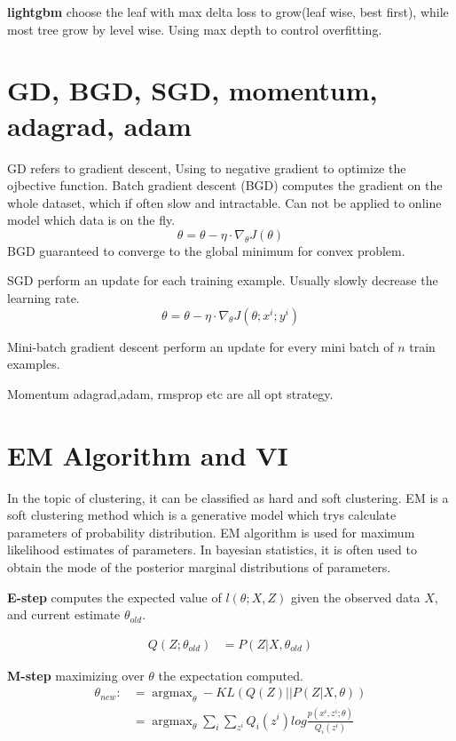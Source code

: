 \documentclass{article}
\begin{document}
\begin{CJK*}{UTF8}{gbsn}
\textbf{lightgbm} choose the leaf with max delta loss to grow(leaf wise, best first), while most tree grow by level wise. Using max depth to control overfitting.

\section{GD, BGD, SGD, momentum, adagrad, adam}
GD refers to gradient descent, Using to negative gradient to optimize the ojbective function.
Batch gradient descent (BGD) computes the gradient on the whole dataset, which if often slow and intractable. Can not be applied to online model which data is on the fly. 
$$\theta=\theta - \eta \cdot \nabla_{\theta} J(\theta)$$
BGD guaranteed to converge to the global minimum for convex problem.

SGD perform an update for each training example. Usually slowly decrease the learning rate.
$$\theta=\theta - \eta \cdot \nabla_{\theta} J(\theta; x^{i};y^{i})$$

Mini-batch gradient descent perform an update for every mini batch of $n$ train examples. 

Momentum adagrad,adam, rmsprop etc are all opt strategy.

\section{EM Algorithm and VI}
In the topic of clustering, it can be classified as hard and soft clustering. EM is a soft clustering method which is a generative model which trys calculate parameters of probability distribution. 
EM algorithm is used for maximum likelihood estimates of parameters. In bayesian statistics, it is often used to obtain the mode of the posterior marginal distributions of parameters.

\textbf{E-step} computes the expected value of $l(\theta;X,Z)$ given the observed data $X$, and current estimate $\theta_{old}$.

\begin{align*}
Q(Z;\theta_{old}) &= P(Z| X,\theta_{old})
\end{align*}

\textbf{M-step} maximizing over $\theta$ the expectation computed.
\begin{align*}
\theta_{new} :&= \mathop{\arg\max}_{\theta} -KL(Q(Z) || P(Z|X,\theta)) \\
&= \mathop{\arg\max}_{\theta} \sum_{i}\sum_{z^{i}} Q_{i}(z^{i})log \frac{p(x^{i},z^{i};\theta)}{Q_{i}(z^{i})}
\end{align*}


\end{CJK*}
\end{document}

